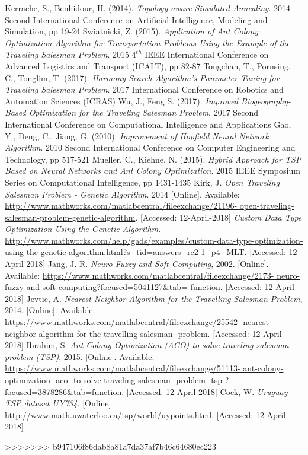 \documentclass[twocolumn]{article}
\begin{document}
\begin{thebibliography}{999}
		Kerrache, S., Benhidour, H. (2014).
		\emph{Topology-aware Simulated Annealing}.
		2014 Second International Conference on Artificial Intelligence, Modeling and Simulation,
		pp 19-24
		Swiatnicki, Z. (2015).
		\emph{Application of Ant Colony Optimization Algorithm for Transportation Problems Using the Example of the Traveling Salesman Problem}.
		2015 $4^{th}$ IEEE International Conference on Advanced Logistics and Transport (ICALT),
		pp 82-87
		Tongchan, T., Pornsing, C., Tonglim, T. (2017).
		\emph{Harmony Search Algorithm's Parameter Tuning for Traveling Salesman Problem}.
		2017 International Conference on Robotics and Automation Sciences (ICRAS)
		Wu, J., Feng S. (2017).
		\emph{Improved Biogeography-Based Optimization for the Traveling Salesman Problem}.
		2017 Second International Conference on Computational Intelligence and Applications
		Gao, Y., Deng, C., Jiang, G. (2010).
		\emph{Improvement of Hopfield Neural Network Algorithm}.
		2010 Second International Conference on Computer Engineering and Technology,
		pp 517-521
		Mueller, C., Kiehne, N. (2015).
		\emph{Hybrid Approach for TSP Based on Neural Networks and Ant Colony Optimization}.
		2015 IEEE Symposium Series on Computational Intelligence,
		pp 1431-1435
		Kirk, J.
		\emph{Open Traveling Salesman Problem - Genetic Algorithm}. 2014 [Online].
		Available: \url{http://www.mathworks.com/matlabcentral/fileexchange/21196-
			open-traveling-salesman-problem-genetic-algorithm}. [Accessed: 12-April-2018]
		\emph{Custom Data Type Optimization Using the Genetic Algorithm}.
		\url{http://www.mathworks.com/help/gads/examples/custom-data-type-optimization-using-the-genetic-algorithm.html?s_tid=answers_rc2-1_p4_MLT}. [Accessed: 12-April-2018]
		Jang, J. R.
		\emph{Neuro-Fuzzy and Soft Computing}, 2002. [Online].
		Available: \url{https://www.mathworks.com/matlabcentral/fileexchange/2173-
			neuro-fuzzy-and-soft-computing?focused=5041127&tab=
			function}. [Accessed: 12-April-2018]
		Jevtic, A.
		\emph{Nearest Neighbor Algorithm for the Travelling Salesman Problem}, 2014. [Online]. Available: \url{https://www.mathworks.com/matlabcentral/fileexchange/25542-
			nearest-neighbor-algorithm-for-the-travelling-salesman-
			problem}. [Accessed: 12-April-2018]
		Ibrahim, S.
		\emph{Ant Colony Optimization (ACO) to solve traveling salesman problem (TSP)}, 2015. [Online]. Available: \url{https://www.mathworks.com/matlabcentral/fileexchange/51113-
			ant-colony-optimization--aco--to-solve-traveling-salesman-
			problem--tsp-?focused=3878286&tab=function}. [Accessed: 12-April-2018]
		Cock, W. \emph{Uruguay TSP dataset UY734}. [Online]
		\url{http://www.math.uwaterloo.ca/tsp/world/uypoints.html}. [Accessed: 12-April-2018]
		
		
	\end{thebibliography}
>>>>>>> b947106f86dab8a81a7da37af7b46c64680ec223
\end{document}
